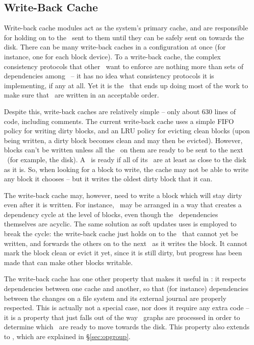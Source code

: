 \subsection{Write-Back Cache}
\label{sec:modules:wbcache}

Write-back cache modules act as the system's primary cache, and are
responsible for holding on to the \chdescs\ sent to them until they can be
safely sent on towards the disk.
%
There can be many write-back caches in a configuration at once (for
instance, one for each block device).
%
To a write-back cache, the complex consistency protocols that
other \modules\ want to enforce are nothing more than sets of dependencies among
\chdescs\ -- it has no idea what consistency protocols it is implementing, if
any at all.
%
Yet it is the \module\ that ends up doing most of the work to make
sure that \chdescs\ are written in an acceptable order.

Despite this, write-back caches are relatively simple -- only about 630 lines of
code, including comments. The current write-back cache uses a simple FIFO policy
for writing dirty blocks, and an LRU policy for evicting clean blocks (upon
being written, a dirty block becomes clean and may then be evicted). However,
blocks can't be written unless all the \chdescs\ on them are ready to be sent to
the next \module\ (for example, the disk). A \chdesc\ is ready if all of its
\befores\ are at least as close to the disk as it is. So, when looking for a
block to write, the cache may not be able to write any block it chooses -- but
it writes the oldest dirty block that it can.

The write-back cache may, however, need to write a block which will stay dirty
even after it is written. For instance, \chdescs\ may be arranged in a way that
creates a dependency cycle at the level of blocks, even though the \chdesc\
dependencies themselves are acyclic. The same solution as soft updates uses is
employed to break the cycle: the write-back cache just holds on to the \chdescs\
that cannot yet be written, and forwards the others on to the next \module\ as
it writes the block. It cannot mark the block clean or evict it yet, since it is
still dirty, but progress has been made that can make other blocks writable.

The write-back cache has one other property that makes it useful in \Kudos: it
respects dependencies between one cache and another, so that (for instance)
dependencies between the changes on a file system and its external journal are
properly respected. This is actually not a special case, nor does it require any
extra code -- it is a property that just falls out of the way \chdesc\ graphs
are processed in order to determine which \chdescs\ are ready to move towards
the disk. This property also extends to \opgroups, which
are explained in \S\ref{sec:opgroup}.
